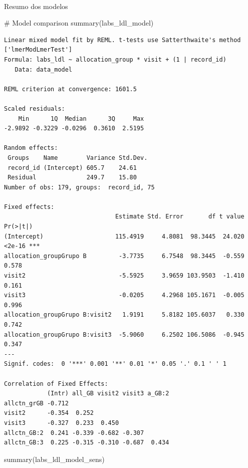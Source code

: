\documentclass[
  12pt,
]{article}
\makeatletter
\let\oldparagraph\paragraph
\renewcommand{\paragraph}{
    \@ifstar
      \xxxParagraphStar
      \xxxParagraphNoStar
  }
\newcommand{\xxxParagraphStar}[1]{\oldparagraph*{#1}\mbox{}}
\newcommand{\xxxParagraphNoStar}[1]{\oldparagraph{#1}\mbox{}}
\newenvironment{Shaded}{\begin{snugshade}}{\end{snugshade}}
\newcommand{\CommentTok}[1]{\textcolor[rgb]{0.37,0.37,0.37}{#1}}
\newcommand{\FunctionTok}[1]{\textcolor[rgb]{0.28,0.35,0.67}{#1}}
\newcommand{\NormalTok}[1]{\textcolor[rgb]{0.00,0.23,0.31}{#1}}
\makeatother
\begin{document}
\paragraph{Resumo dos modelos}\label{resumo-dos-modelos-5}

\begin{Shaded}
\begin{Highlighting}[]
\CommentTok{\# Model comparison}
\FunctionTok{summary}\NormalTok{(labs\_ldl\_model)}
\end{Highlighting}
\end{Shaded}

\begin{verbatim}
Linear mixed model fit by REML. t-tests use Satterthwaite's method ['lmerModLmerTest']
Formula: labs_ldl ~ allocation_group * visit + (1 | record_id)
   Data: data_model

REML criterion at convergence: 1601.5

Scaled residuals: 
    Min      1Q  Median      3Q     Max 
-2.9892 -0.3229 -0.0296  0.3610  2.5195 

Random effects:
 Groups    Name        Variance Std.Dev.
 record_id (Intercept) 605.7    24.61   
 Residual              249.7    15.80   
Number of obs: 179, groups:  record_id, 75

Fixed effects:
                               Estimate Std. Error       df t value Pr(>|t|)    
(Intercept)                    115.4919     4.8081  98.3445  24.020   <2e-16 ***
allocation_groupGrupo B         -3.7735     6.7548  98.3445  -0.559    0.578    
visit2                          -5.5925     3.9659 103.9503  -1.410    0.161    
visit3                          -0.0205     4.2968 105.1671  -0.005    0.996    
allocation_groupGrupo B:visit2   1.9191     5.8182 105.6037   0.330    0.742    
allocation_groupGrupo B:visit3  -5.9060     6.2502 106.5086  -0.945    0.347    
---
Signif. codes:  0 '***' 0.001 '**' 0.01 '*' 0.05 '.' 0.1 ' ' 1

Correlation of Fixed Effects:
            (Intr) all_GB visit2 visit3 a_GB:2
allctn_grGB -0.712                            
visit2      -0.354  0.252                     
visit3      -0.327  0.233  0.450              
allctn_GB:2  0.241 -0.339 -0.682 -0.307       
allctn_GB:3  0.225 -0.315 -0.310 -0.687  0.434
\end{verbatim}

\begin{Shaded}
\begin{Highlighting}[]
\FunctionTok{summary}\NormalTok{(labs\_ldl\_model\_sens)}
\end{Highlighting}
\end{Shaded}
\end{document}
